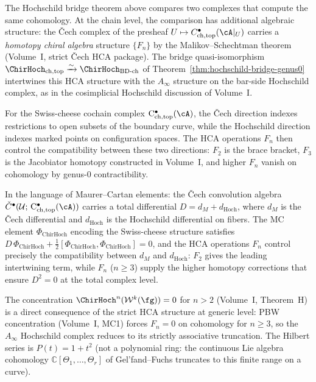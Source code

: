 \begin{remark}
\label{rem:hca-hochschild-descent}
The Hochschild bridge theorem above compares two complexes that
compute the same cohomology. At the chain level, the comparison
has additional algebraic structure: the \v{C}ech complex of the
presheaf $U \mapsto C^\bullet_{\mathrm{ch,top}}(\cA|_U)$ carries
a \emph{homotopy chiral algebra} structure $\{F_n\}$ by the
Malikov--Schechtman theorem~\cite{MS24} (Volume~I,
strict \v{C}ech HCA package). The bridge quasi-isomorphism
$\ChirHoch_{\mathrm{ch,top}} \xrightarrow{\sim}
\ChirHoch_{\mathrm{BD\text{-}ch}}$
of Theorem~\ref{thm:hochschild-bridge-genus0} intertwines
this HCA structure with the $A_\infty$ structure on the bar-side
Hochschild complex, as in the cosimplicial Hochschild discussion
of Volume~I.

For the Swiss-cheese cochain complex
$\mathrm{C}^\bullet_{\mathrm{ch,top}}(\cA)$, the \v{C}ech
direction indexes restrictions to open subsets of the boundary
curve, while the Hochschild direction indexes marked points
on configuration spaces. The HCA operations $F_n$ then control
the compatibility between these two directions: $F_2$ is the
brace bracket, $F_3$ is the Jacobiator homotopy constructed in
Volume~I,
and higher $F_n$ vanish on cohomology by
genus-$0$ contractibility.

In the language of Maurer--Cartan elements: the \v{C}ech
convolution algebra
$\check{C}^\bullet(\mathcal{U};\,
\mathrm{C}^\bullet_{\mathrm{ch,top}}(\cA))$ carries a
total differential $D = d_M + d_{\mathrm{Hoch}}$, where
$d_M$ is the \v{C}ech differential and
$d_{\mathrm{Hoch}}$ is the Hochschild differential
on fibers. The MC element $\Phi_{\mathrm{ChirHoch}}$
encoding the Swiss-cheese structure satisfies
$D\,\Phi_{\mathrm{ChirHoch}}
+ \tfrac{1}{2}[\Phi_{\mathrm{ChirHoch}},
\Phi_{\mathrm{ChirHoch}}] = 0$, and
the HCA operations $F_n$ control precisely
the compatibility between $d_M$ and $d_{\mathrm{Hoch}}$:
$F_2$ gives the leading intertwining term, while
$F_n$ ($n \geq 3$) supply the higher homotopy corrections
that ensure $D^2 = 0$ at the total complex level.

The concentration $\ChirHoch^n(\mathcal{W}^k(\fg)) = 0$ for
$n > 2$ (Volume~I, Theorem~H) is a direct consequence of the
strict HCA structure at generic level: PBW concentration
(Volume~I, MC1) forces $F_n = 0$ on cohomology for $n \geq 3$,
so the $A_\infty$ Hochschild complex reduces to its strictly
associative truncation. The Hilbert series is $P(t) = 1 + t^2$
(not a polynomial ring: the continuous Lie algebra cohomology
$\mathbb{C}[\Theta_1,\ldots,\Theta_r]$ of Gel'fand--Fuchs
truncates to this finite range on a curve).
\end{remark}

